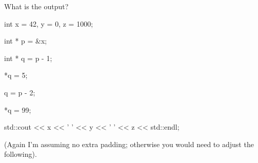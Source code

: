 What is the output?



\begin{consolethree}[escapeinside=||]

int x = 42, y = 0, z = 1000;

int * p = &x;

int * q = p - 1;

*q = 5;

q = p - 2;

*q = 99;

std::cout << x << ' ' << y << ' ' << z << std::endl;

\end{consolethree}



(Again I'm assuming no extra padding; otherwise you would need to adjust the following).

